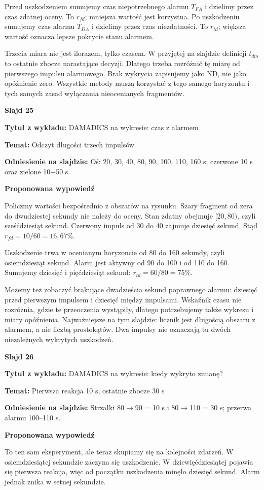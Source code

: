 \documentclass[a4paper,11pt]{article}
\newcommand{\NumerSlajdu}{1}
\newcommand{\Komentarz}[3]{%
  \gdef\NumerSlajdu{#1}%
  {\Large\bfseries Slajd #1\par}\smallskip
  \textbf{Tytuł z wykładu:} #2\par
  \textbf{Temat:} #3\par\medskip
}
\begin{document}
Przed uszkodzeniem sumujemy czas niepotrzebnego alarmu $T_{FA}$ i dzielimy przez czas zdatnej oceny. To $r_{fd}$; mniejsza wartość jest korzystna. Po uszkodzeniu sumujemy czas alarmu $T_{DA}$ i dzielimy przez czas niezdatności. To $r_{td}$; większa wartość oznacza lepsze pokrycie stanu alarmem.

Trzecia miara nie jest ilorazem, tylko czasem. W przyjętej na slajdzie definicji $t_{dm}$ to ostatnie zbocze narastające decyzji. Dlatego trzeba rozróżnić tę miarę od pierwszego impulsu alarmowego. Brak wykrycia zapisujemy jako ND, nie jako opóźnienie zero. Wszystkie metody muszą korzystać z tego samego horyzontu i tych samych zasad wyłączania nieocenianych fragmentów.
\clearpage

\Komentarz{25}{DAMADICS na wykresie: czas z alarmem}{Odczyt długości trzech impulsów}
{\small\color{black!65}\textbf{Odniesienie na slajdzie:} Oś: 20, 30, 40, 80, 90, 100, 110, 160 s; czerwone 10 s oraz zielone 10+50 s.\par}
\medskip
\textbf{Proponowana wypowiedź}\par
Policzmy wartości bezpośrednio z obszarów na rysunku. Szary fragment od zera do dwudziestej sekundy nie należy do oceny. Stan zdatny obejmuje $[20,80)$, czyli sześćdziesiąt sekund. Czerwony impuls od 30 do 40 zajmuje dziesięć sekund. Stąd $r_{fd}=10/60=16{,}67\%$.

Uszkodzenie trwa w ocenianym horyzoncie od 80 do 160 sekundy, czyli osiemdziesiąt sekund. Alarm jest aktywny od 90 do 100 i od 110 do 160. Sumujemy dziesięć i pięćdziesiąt sekund: $r_{td}=60/80=75\%$.

Możemy też zobaczyć brakujące dwadzieścia sekund poprawnego alarmu: dziesięć przed pierwszym impulsem i dziesięć między impulsami. Wskaźnik czasu nie rozróżnia, gdzie te przeoczenia wystąpiły, dlatego potrzebujemy także wykresu i miary opóźnienia. Najważniejsze na tym slajdzie: licznik jest długością obszaru z alarmem, a nie liczbą prostokątów. Dwa impulsy nie oznaczają tu dwóch niezależnych wykrytych uszkodzeń.
\clearpage

\Komentarz{26}{DAMADICS na wykresie: kiedy wykryto zmianę?}{Pierwsza reakcja 10 s, ostatnie zbocze 30 s}
{\small\color{black!65}\textbf{Odniesienie na slajdzie:} Strzałki 80\ensuremath{\to}90 = 10 s i 80\ensuremath{\to}110 = 30 s; przerwa alarmu 100–110 s.\par}
\medskip
\textbf{Proponowana wypowiedź}\par
To ten sam eksperyment, ale teraz skupiamy się na kolejności zdarzeń. W osiemdziesiątej sekundzie zaczyna się uszkodzenie. W dziewięćdziesiątej pojawia się pierwsza reakcja, więc od początku uszkodzenia minęło dziesięć sekund. Alarm jednak znika w setnej sekundzie.
\end{document}
